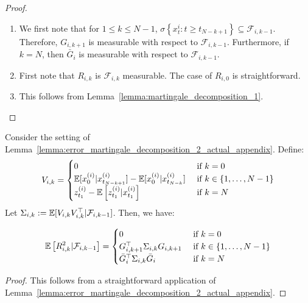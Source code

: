\begin{proof} 
\begin{enumerate}
\item 
    We first note that for $1 \leq k \leq N-1$, $  \sigma\left\{x_{t}^{i} :  t \geq t_{N-k+1}\right\} \subseteq \mathcal{F}_{i, k-1}$.  Therefore, $G_{i,k+1}$ is measurable with respect to $\mathcal{F}_{i, k-1}$. Furthermore, if $k=N$, then $\bar{G}_{i}$ is measurable with respect to $\mathcal{F}_{i, k-1}$. 
    
\item First note that $R_{i,k}$ is $\mathcal{F}_{i,k}$ measurable.
The case of $R_{i,0}$ is straightforward. 

\item This follows from Lemma~\ref{lemma:martingale_decomposition_1}.
\end{enumerate}
\end{proof}



\begin{lemma}\label{lemma:variance_bound_1}
Consider the setting of Lemma~\ref{lemma:error_martingale_decomposition_2_actual_appendix}. Define:
\begin{equation}
    V_{i,k} = \begin{cases} 0 &\text{ if } k = 0 \\
    \mathbb{E}[x_0^{(i)}|x_{t_{N-k+1}}^{(i)}]-\mathbb{E}[x_0^{(i)}|x_{t_{N-k}}^{(i)}] &\text{ if } k \in \{1,\dots,N-1\} \\
    z_{t_1}^{(i)}-\mathbb{E}\left[z_{t_1}^{(i)}|x_{t_1}^{(i)}\right] &\text{ if } k = N 
    \end{cases}
\end{equation}
Let $\Sigma_{i,k} := \mathbb{E}[V_{i,k}V_{i,k}^{\top}|\mathcal{F}_{i,k-1}]$. Then, we have:

\begin{equation}
    \mathbb{E}\left[R_{i,k}^{2}|\mathcal{F}_{i,k-1}\right] = \begin{cases} 0 &\text{ if } k = 0 \\
    G_{i,k+1}^{\top}\Sigma_{i,k}G_{i,k+1}&\text{ if } k \in \{1,\dots,N-1\} \\
    \bar{G}_i^{\top} \Sigma_{i,k}\bar{G}_i &\text{ if } k = N 
    \end{cases}
\end{equation}

\end{lemma}
\begin{proof}

This follows from a straightforward application of Lemma~\ref{lemma:error_martingale_decomposition_2_actual_appendix}.
\end{proof}



